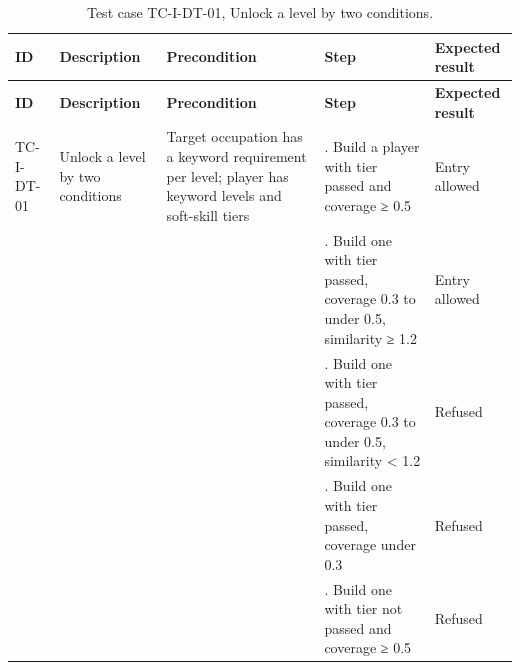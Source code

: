 {\small
\begin{longtable}{|>{\raggedright\arraybackslash}p{}|>{\raggedright\arraybackslash}p{}|>{\raggedright\arraybackslash}p{}|>{\raggedright\arraybackslash}p{}|>{\raggedright\arraybackslash}p{}|}
\caption{Test case TC-I-DT-01, Unlock a level by two conditions.} \\
\hline
\textbf{ID} & \textbf{Description} & \textbf{Precondition} & \textbf{Step} & \textbf{Expected result} \\ \hline
\endfirsthead
\hline
\textbf{ID} & \textbf{Description} & \textbf{Precondition} & \textbf{Step} & \textbf{Expected result} \\ \hline
\endhead
TC-I-DT-01 & Unlock a level by two conditions & Target occupation has a keyword requirement per level; player has keyword levels and soft-skill tiers & 1. Build a player with tier passed and coverage ≥ 0.5 & Entry allowed \\ \hline
 &  &  & 2. Build one with tier passed, coverage 0.3 to under 0.5, similarity ≥ 1.2 & Entry allowed \\ \hline
 &  &  & 3. Build one with tier passed, coverage 0.3 to under 0.5, similarity < 1.2 & Refused \\ \hline
 &  &  & 4. Build one with tier passed, coverage under 0.3 & Refused \\ \hline
 &  &  & 5. Build one with tier not passed and coverage ≥ 0.5 & Refused \\ \hline
\end{longtable}
}

